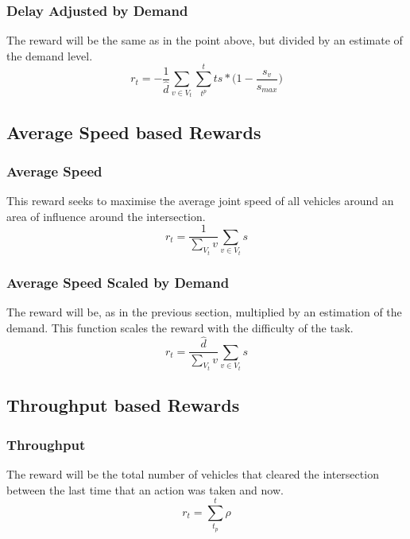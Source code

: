 \documentclass[conference]{IEEEtran}
\begin{document}
\subsubsection{Delay Adjusted by Demand}
The reward will be the same as in the point above, but divided by an estimate of the demand level.
\begin{equation}
    r_t = -\frac{1}{\hat{d}} \sum_{v\in V_t}  \sum_{t^p}^t ts * \big( 1-\frac{s_v}{s_{max}} \big)
\label{eq:delay}
\end{equation}

\subsection{Average Speed based Rewards}
\subsubsection{Average Speed}
This reward seeks to maximise the average joint speed of all vehicles around an area of influence around the intersection.
\begin{equation}
    r_t = \frac{1}{\sum_{V_t} v} \sum_{v \in V_t} s
\label{eq:avgspeed}
\end{equation}

\subsubsection{Average Speed Scaled by Demand}
The reward will be, as in the previous section, multiplied by an estimation of the demand. This function scales the reward with the difficulty of the task.
\begin{equation}
    r_t = \frac{\hat{d}}{\sum_{V_t} v} \sum_{v \in V_t} s
\label{eq:avgspeed_dn}
\end{equation}

\subsection{Throughput based Rewards}
\subsubsection{Throughput}
The reward will be the total number of vehicles that cleared the intersection between the last time that an action was taken and now.
\begin{equation}
    r_t = \sum_{t_p}^t \rho
\label{eq:throughput}
\end{equation}
\end{document}
